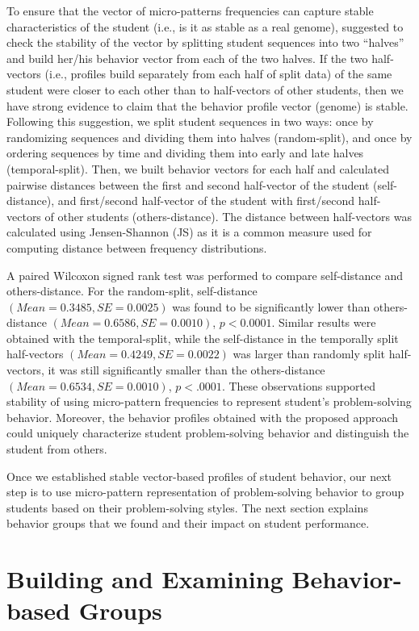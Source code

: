 \documentclass{sigchi}
\begin{document}
To ensure that the vector of micro-patterns frequencies can capture stable characteristics of the student (i.e., is it as stable as a real genome), \cite{guerra2014problem} suggested to check the stability of the vector by splitting student sequences into two ``halves'' and build her/his behavior vector from each of the two halves. If the two half-vectors (i.e., profiles build separately from each half of split data) of the same student were closer to each other than to half-vectors of other students, then we have strong evidence to claim that the behavior profile vector (genome) is stable. Following this suggestion, we split student sequences in two ways: once by randomizing sequences and dividing them into halves (random-split), and once by ordering sequences by time and dividing them into early and late halves (temporal-split). Then, we built behavior vectors for each half and calculated pairwise distances between the first and second half-vector of the student (self-distance), and first/second half-vector of the student with first/second half-vectors of other students (others-distance). The distance between half-vectors was calculated using Jensen-Shannon (JS) as it is a common measure used for computing distance between frequency distributions.

A paired Wilcoxon signed rank test was performed to compare self-distance and others-distance. For the random-split, self-distance $(Mean=0.3485,SE=0.0025)$ was found to be significantly lower than others-distance $(Mean=0.6586,SE=0.0010)$, $p<0.0001$. Similar results were obtained with the temporal-split, while the self-distance in the temporally split half-vectors $(Mean=0.4249,SE=0.0022)$ was larger than randomly split half-vectors, it was still significantly smaller than the others-distance $(Mean=0.6534,SE=0.0010)$, $p < .0001$. These observations supported stability of using micro-pattern frequencies to represent student's problem-solving behavior. Moreover, the behavior profiles obtained with the proposed approach could uniquely characterize student problem-solving behavior and distinguish the student from others.

Once we established stable vector-based profiles of student behavior, our next step is to use micro-pattern representation of problem-solving behavior to group students based on their problem-solving styles. The next section explains behavior groups that we found and their impact on student performance.

\section{Building and Examining Behavior-based Groups}
\end{document}
